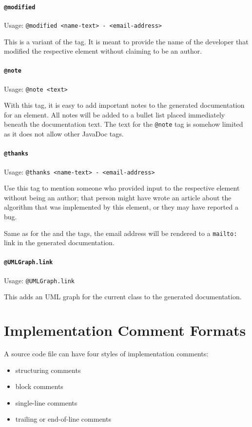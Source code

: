 \documentclass[11pt,a4paper, titlepage, parskip=half, headsepline, footsepline, cleardoublepage=current, headheight=1cm]{scrbook}
\begin{document}
\paragraph{\lstinline|@modified|}\label{sec:TagModified}  Usage: \lstinline|@modified <name-text> - <email-address>|

This is a variant of the  tag. It is meant to provide the name of the developer that modified the respective element without claiming to be an author.

\paragraph{\lstinline|@note|}\label{sec:TagNote}  Usage: \lstinline|@note <text>|

With this tag, it is easy to add important notes to the generated documentation for an element. All notes will be added to a bullet list placed immediately beneath the documentation text. The text for the \lstinline|@note| tag is somehow limited as it does not allow other JavaDoc tags.

\paragraph{\lstinline|@thanks|}\label{sec:TagThanks}  Usage: \lstinline|@thanks <name-text> - <email-address>|

Use this tag to mention someone who provided input to the respective element without being an author; that person might have wrote an article about the algorithm that was implemented by this element, or they may have reported a bug.

Same as for the  and the  tags, the email address will be rendered to a \verb#mailto:# link in the generated documentation.

\paragraph{\lstinline|@UMLGraph.link|}\label{sec:TagUMLGraph}  Usage: \lstinline|@UMLGraph.link|

This adds an UML graph for the current class to the generated documentation.


\section{Implementation Comment Formats}
A source code file can have four styles of implementation comments:
\begin{itemize}[nosep]
\item{structuring comments}
\item{block comments}
\item{single-line comments}
\item{trailing or end-of-line comments}
\end{itemize}
\end{document}
